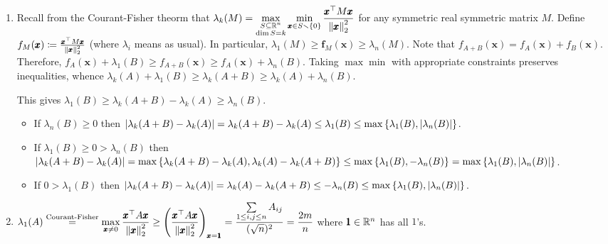 \soln
\begin{enumerate}[leftmargin=*, label=(\alph*)]
\item Recall from the Courant-Fisher theorm that $\displaystyle\lambda_{k}(M) = \max_{\substack{S\subseteq \mathbb{R}^{n}\\ \dim S=k}}\min_{\pmb x\in S\smallsetminus\left\{0\right\}} \frac{\pmb x^{\top}M\pmb x}{\left\lVert \pmb x \right\rVert_{2}^{2}}$ for any symmetric real symmetric matrix $M$. Define $f_{M}(\pmb x) \coloneqq \frac{\pmb x^{\top}M\pmb x}{\left\lVert \pmb x \right\rVert_{2}^{2}}$ (where $\lambda_{i}$ means as usual). In particular, $\lambda_{1}(M) \ge \pmb f_{M}(\pmb x) \ge \lambda_{n}(M)$. Note that $f_{A+B}(\pmb x) = f_{A}(\pmb x) + f_{B}(\pmb x)$. Therefore, $f_{A}(\pmb x) + \lambda_{1}(B)\ge f_{A+B}(\pmb x) \ge f_{A}(\pmb x) + \lambda_{n}(B)$. Taking $\max\min$ with appropriate constraints preserves inequalities, whence $\lambda_{k}(A)+\lambda_{1}(B) \ge \lambda_{k}(A+B)\ge \lambda_{k}(A) + \lambda_{n}(B)$. 

This gives $\lambda_{1}(B)\ge \lambda_{k}(A+B) - \lambda_{k}(A)\ge \lambda_{n}(B)$. \begin{itemize}
\item If $\lambda_{n}(B)\ge 0$ then $\left| \lambda_{k}(A+B) - \lambda_{k}(A) \right| = \lambda_{k}(A+B) - \lambda_{k}(A) \le \lambda_{1}(B) \le \max\left\{\lambda_{1}(B),\left| \lambda_{n}(B) \right|\right\}$.
\item If $\lambda_{1}(B)\ge 0 >\lambda_{n}(B)$ then $\left| \lambda_{k}(A+B) - \lambda_{k}(A) \right| = \max\left\{\lambda_{k}(A+B) - \lambda_{k}(A), \lambda_{k}(A)-\lambda_{k}(A+B)\right\} \le  \max\left\{\lambda_{1}(B),-\lambda_{n}(B)\right\} =  \max\left\{\lambda_{1}(B),\left| \lambda_{n}(B) \right|\right\}$.
\item If $0>\lambda_{1}(B)$ then $\left| \lambda_{k}(A+B) - \lambda_{k}(A) \right| = \lambda_{k}(A) - \lambda_{k}(A+B) \le -\lambda_{n}(B) \le \max\left\{\lambda_{1}(B),\left| \lambda_{n}(B) \right|\right\}$.
\end{itemize}
\item $\displaystyle\lambda_{1}(A) \stackrel{\text{Courant-Fisher}}{=} \max_{\pmb x\ne 0}\frac{\pmb x^{\top}A\pmb x}{\left\lVert \pmb x \right\rVert_{2}^{2}} \ge \left(\frac{\pmb x^{\top}A\pmb x}{\left\lVert \pmb x \right\rVert_{2}^{2}}\right)_{\pmb x=\pmb 1} = \frac{\sum\limits_{1\le i,j\le n}A_{ij}}{(\sqrt n)^{2}} = \frac{2m}{n}$ where $\pmb1\in\mathbb{R}^{n}$ has all $1$'s.
\end{enumerate}







